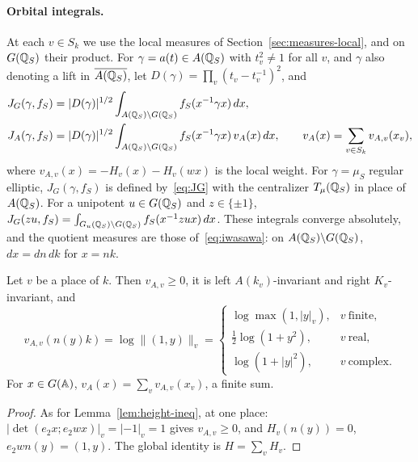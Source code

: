 \paragraph{Orbital integrals.} At each $v\in S_k$ we use the local
measures of Section~\ref{sec:measures-local}, and on $G(\mathbb{Q}_S)$ their
product. For $\gamma=a(t)\in A(\mathbb{Q}_S)$ with $t_v^2\ne1$ for all $v$, and
$\gamma$ also denoting a lift in $\overline{A(\mathbb{Q}_S)}$, let
$D(\gamma)=\prod_v(t_v-t_v^{-1})^2$, and
\begin{align}
J_G(\gamma,f_S)&=|D(\gamma)|^{1/2}\int_{A(\mathbb{Q}_S)\backslash G(\mathbb{Q}_S)}
f_S(x^{-1}\gamma x)\,dx,\label{eq:JG}\\
J_A(\gamma,f_S)&=|D(\gamma)|^{1/2}\int_{A(\mathbb{Q}_S)\backslash G(\mathbb{Q}_S)}
f_S(x^{-1}\gamma x)\,v_A(x)\,dx,\qquad
v_A(x)=\sum_{v\in S_k}v_{A,v}(x_v),\label{eq:JA}
\end{align}
where $v_{A,v}(x)=-H_v(x)-H_v(wx)$ is the local weight. For
$\gamma=\mu_S$ regular elliptic, $J_G(\gamma,f_S)$ is defined
by~\eqref{eq:JG} with the centralizer $T_\mu(\mathbb{Q}_S)$ in place of
$A(\mathbb{Q}_S)$.
For a unipotent $u\in G(\mathbb{Q}_S)$ and $z\in\{\pm1\}$, $J_G(zu,f_S)=
\int_{G_u(\mathbb{Q}_S)\backslash G(\mathbb{Q}_S)}f_S(x^{-1}zux)\,dx$. These integrals
converge absolutely, and the quotient measures are those of~\eqref{eq:iwasawa}:
on $A(\mathbb{Q}_S)\backslash G(\mathbb{Q}_S)$, $dx=dn\,dk$ for $x=nk$.

\begin{lemma}\label{lem:weight-local}
Let $v$ be a place of $k$. Then $v_{A,v}\ge0$, it is left
$A(k_v)$-invariant and right $K_v$-invariant, and
\[
v_{A,v}(n(y)k)=\log\|(1,y)\|_v=\begin{cases}
\log\max(1,|y|_v),&v\ \text{finite},\\
\tfrac12\log(1+y^2),&v\ \text{real},\\
\log(1+|y|^2),&v\ \text{complex}.\end{cases}
\]
For $x\in G(\mathbb{A})$, $v_A(x)=\sum_vv_{A,v}(x_v)$, a finite sum.
\end{lemma}

\begin{proof}
As for Lemma~\ref{lem:height-ineq}, at one place: $|\det(e_2x;e_2wx)|_v
=|-1|_v=1$ gives $v_{A,v}\ge0$, and $H_v(n(y))=0$, $e_2wn(y)=(1,y)$. The
global identity is $H=\sum_vH_v$.
\end{proof}

